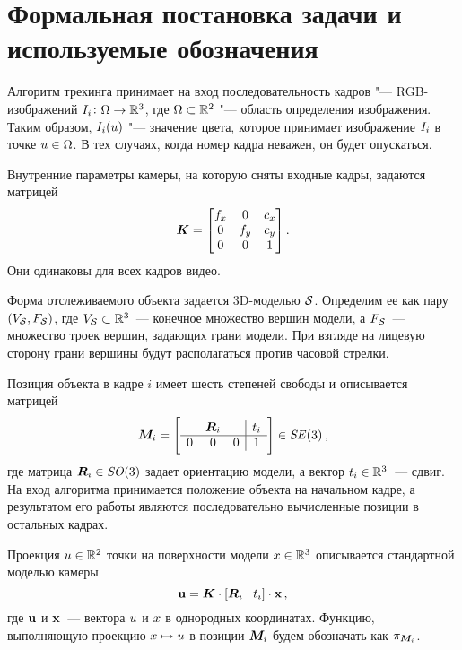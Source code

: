 \section{Формальная постановка задачи и используемые обозначения}\label{formalization}

Алгоритм трекинга принимает на вход последовательность кадров "---
RGB-изображений
$
    I_i \colon \Omega \to \mathbb{R}^3
$,
где $\Omega \subset \mathbb{R}^2$ "--- область определения изображения.
Таким образом, $I_i(\mathnormal{u})$ "--- значение цвета, которое принимает
изображение $I_i$ в точке $\mathnormal{u} \in \Omega$.
В тех случаях, когда номер кадра неважен, он будет опускаться.

Внутренние параметры камеры, на которую сняты входные кадры, задаются матрицей
\begin{equation}\label{eqn:camintr}
    \bm{K} = \begin{bmatrix}
        f_x & 0   & c_x \\
        0   & f_y & c_y \\
        0   & 0   & 1
    \end{bmatrix}
    \text{.}
\end{equation}
Они одинаковы для всех кадров видео.

Форма отслеживаемого объекта задается 3D-моделью $\mathcal{S}$.
Определим ее как пару $(V_{\mathcal{S}}, F_{\mathcal{S}})$, где
$V_{\mathcal{S}} \subset \mathbb{R}^3$~--- конечное множество вершин модели, а
$F_{\mathcal{S}}$~--- множество троек вершин, задающих грани модели.
При взгляде на лицевую сторону грани вершины будут располагаться против часовой
стрелки.

Позиция объекта в кадре $i$ имеет шесть степеней свободы и описывается матрицей
\begin{equation}\label{eqn:modelpose}
    \bm{M}_i = \left[ \begin{array}{ccc|c}
          & \bm{R}_i &   & \mathnormal{t}_i \\
        \hline
        0 & 0         & 0 & 1
    \end{array} \right] \in \mathit{SE}(3)
    \,\text{,}
\end{equation}
где матрица $\bm{R}_i \in \mathit{SO}(3)$ задает ориентацию модели, а вектор
$\mathnormal{t}_i \in \mathbb{R}^3$~--- сдвиг.
На вход алгоритма принимается положение объекта на начальном кадре,
а результатом его работы являются последовательно вычисленные позиции
в остальных кадрах.

Проекция $\mathnormal{u} \in \mathbb{R}^2$ точки на поверхности модели
$\mathnormal{x} \in \mathbb{R}^3$ описывается стандартной моделью камеры
\begin{equation}\label{eqn:proj}
    \mathbf{u} = \bm{K} \cdot [\bm{R}_i \mid \mathnormal{t}_i] \cdot \mathbf{x}
    \,\text{,}
\end{equation}
где $\mathbf{u}$ и $\mathbf{x}$~--- вектора $\mathnormal{u}$ и $\mathnormal{x}$ в однородных
координатах. Функцию, выполняющую проекцию $\mathnormal{x} \mapsto \mathnormal{u}$ в
позиции $\bm{M}_i$ будем обозначать как $\pi_{\bm{M}_i}$.

